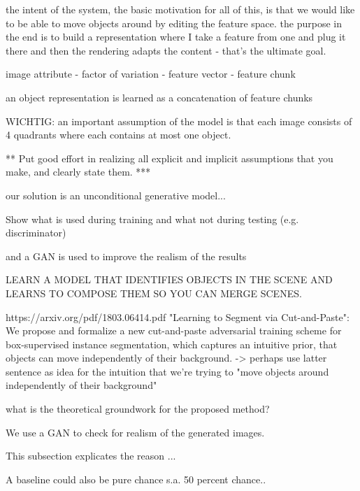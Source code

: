 \documentclass[11pt,a4paper]{article}
\begin{document}
the intent of the system, the basic motivation for all of this, is that we would like to be able to move objects around by editing the feature space. the purpose in the end is to build a representation where I take a feature from one and plug it there and then the rendering adapts the content - that's the ultimate goal.
\par image attribute - factor of variation - feature vector - feature chunk
\par an object representation is learned as a concatenation of feature chunks

\par WICHTIG: an important assumption of the model is that each image consists of 4 quadrants where each contains at most one object.

\par ***
Put good effort in realizing
all explicit and implicit assumptions that you make, and
clearly state them.
***

\par our solution is an unconditional generative model...

\par Show what is used during training and what not during testing (e.g. discriminator)

\par and a GAN is used to improve the realism of the results

\par LEARN A MODEL THAT IDENTIFIES OBJECTS IN THE SCENE AND LEARNS TO COMPOSE THEM SO YOU CAN MERGE SCENES.

\par https://arxiv.org/pdf/1803.06414.pdf "Learning to Segment via Cut-and-Paste": We propose and formalize a new cut-and-paste adversarial training scheme for box-supervised instance segmentation, which captures an intuitive prior, that objects can move independently of their background.
-> perhaps use latter sentence as idea for the intuition that we're trying to "move objects around independently of their background"

\par what is the theoretical groundwork for the proposed method?

\par We use a GAN to check for realism of the generated images.

\par This subsection explicates the reason ...

\par A baseline could also be pure chance s.a. 50 percent chance..
\end{document}
